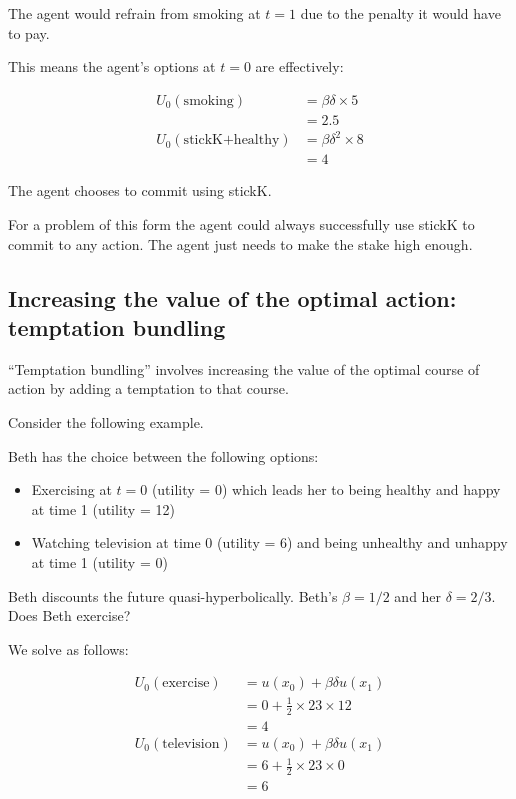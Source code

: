 \documentclass[
  letterpaper,
  DIV=11,
  numbers=noendperiod]{scrreprt}
\begin{document}
The agent would refrain from smoking at \(t=1\) due to the penalty it
would have to pay.

This means the agent's options at \(t=0\) are effectively:

\begin{align*}
U_0(\text{smoking})&=\beta\delta\times 5 \\
&=2.5
\\
U_0(\text{stickK+healthy})&=\beta\delta^2\times 8 \\
&=4
\end{align*}

The agent chooses to commit using stickK.

For a problem of this form the agent could always successfully use
stickK to commit to any action. The agent just needs to make the stake
high enough.

\hypertarget{increasing-the-value-of-the-optimal-action-temptation-bundling}{%
\subsection{Increasing the value of the optimal action: temptation
bundling}\label{increasing-the-value-of-the-optimal-action-temptation-bundling}}

``Temptation bundling'' involves increasing the value of the optimal
course of action by adding a temptation to that course.

Consider the following example.

Beth has the choice between the following options:

\begin{itemize}
\item
  Exercising at \(t=0\) (utility = 0) which leads her to being healthy
  and happy at time 1 (utility = 12)
\item
  Watching television at time 0 (utility = 6) and being unhealthy and
  unhappy at time 1 (utility = 0)
\end{itemize}

Beth discounts the future quasi-hyperbolically. Beth's \(\beta=1/2\) and
her \(\delta=2/3\). Does Beth exercise?

We solve as follows:

\begin{align*}
U_0(\text{exercise})&=u(x_0)+\beta\delta u(x_1) \\
&=0+\frac{1}{2}\times {2}{3}\times 12 \\
&=4
\\
U_0(\text{television})&=u(x_0)+\beta\delta u(x_1) \\
&=6+\frac{1}{2}\times {2}{3}\times 0 \\
&=6
\end{align*}
\end{document}
